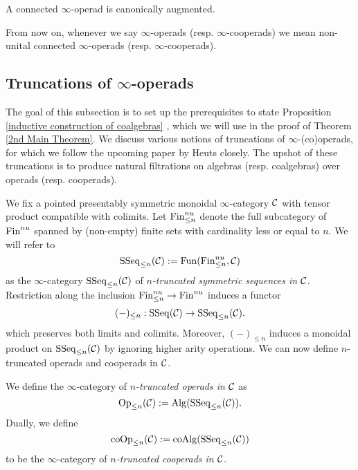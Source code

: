 \begin{remark}
A connected $\infty$-operad is canonically augmented.
\end{remark}  

\begin{remark}
From now on, whenever we say $\infty$-operads (resp. $\infty$-cooperads) we mean non-unital connected $\infty$-operads (resp. $\infty$-cooperads).
\end{remark}


\subsection{Truncations of $\infty$-operads}
The goal of this subsection is to set up the prerequisites to state Proposition \ref{inductive construction of coalgebras}  \cite[Theorem 4.12]{Heuts_Koszul}, which we will use in the proof of Theorem \ref{2nd Main Theorem}. 
We discuss various notions of truncations of $\infty$-(co)operads, for which we follow the upcoming paper by Heuts \cite{Heuts_Koszul} closely. The upshot of these truncations is to produce natural filtrations on algebras (resp. coalgebras) over operads (resp. cooperads). 


We fix a pointed presentably symmetric monoidal $\infty$-category ${\mathcal{C}}$ with tensor product compatible with colimits.
Let $\operatorname{Fin}^{nu}_{\leq n}$ denote the full subcategory of $\operatorname{Fin}^{nu}$ spanned by (non-empty) finite sets with cardinality less or equal to $n$.
We will refer to
$$
\operatorname{SSeq}_{\leq n}({\mathcal{C}}):=\operatorname{Fun}(\operatorname{Fin}^{nu}_{\leq n}, {\mathcal{C}})
$$ 
as the $\infty$-category $\operatorname{SSeq}_{\leq n}({\mathcal{C}})$ of \emph{$n$-truncated symmetric sequences in ${\mathcal{C}}$}.
Restriction along the inclusion $\operatorname{Fin}^{nu}_{\leq n}\to \operatorname{Fin}^{nu}$ induces a
functor 
$$
(-)_{\leq n}: \operatorname{SSeq}({\mathcal{C}}) \to 
\operatorname{SSeq}_{\leq n}({\mathcal{C}}).
$$
which preserves both limits and colimits. Moreover, $(-)_{\leq n}$ induces a
monoidal product on $\operatorname{SSeq}_{\leq n}({\mathcal{C}})$ by ignoring higher arity operations.
We can now define $n$-truncated operads and cooperads in ${\mathcal{C}}$.
\begin{definition}
    We define the $\infty$-category of \emph{$n$-truncated operads in ${\mathcal{C}}$} as 
    $$
    \operatorname{Op}_{\leq n}({\mathcal{C}}) :=\operatorname{Alg}(\operatorname{SSeq}_{\leq n}({\mathcal{C}})).
    $$
    Dually, we define 
    $$
     \operatorname{coOp}_{\leq n}({\mathcal{C}}) := \operatorname{coAlg}(\operatorname{SSeq}_{\leq n}({\mathcal{C}})) 
    $$
    to be the $\infty$-category of \emph{$n$-truncated cooperads in ${\mathcal{C}}$}.
\end{definition}

